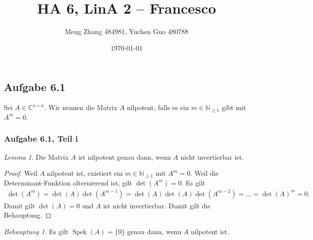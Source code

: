 \documentclass[draft,a5paper]{article}
\author{Meng Zhang 484981, Yuchen Guo 480788}
\date{\today}
\title{HA 6, LinA 2 -- Francesco}
\theoremstyle{remark}
\newtheorem*{beh}{Behauptung}
\newtheorem*{lem}{Lemma}
\DeclareMathOperator{\Spek}{Spek}
\begin{document}
\maketitle

\subsection*{Aufgabe 6.1}

Sei \(A \in \mathbb{C}^{n \times n}\). Wir nennen die Matrix \(A\) nilpotent, falls es
ein \(m \in \mathbb{N}_{\ge 1}\) gibt mit \(A^{m} = 0\).

\subsubsection*{Aufgabe 6.1, Teil i}

\begin{lem}
  Die Matrix \(A\) ist nilpotent genau dann, wenn \(A\) nicht
  invertierbar ist.
\end{lem}

\begin{proof}
  Weil \(A\) nilpotent ist, existiert ein \(m \in \mathbb{N}_{\ge 1}\) mit
  \(A^{m} = 0\).  Weil die Determinant-Funktion alternierend ist, gilt
  \(\det(A^{m}) = 0\).  Es gilt
  \begin{align*}
    \det(A^{m}) = \det(A)\det(A^{m-1}) = \det(A)\det(A)\det(A^{m-2}) =
    \ldots = \det(A)^{m} = 0.
  \end{align*}
  Damit gilt \(\det(A) = 0\) und \(A\) ist nicht invertierbar.  Damit
  gilt die Behauptung.
\end{proof}

\begin{beh}
  Es gilt \(\Spek(A) = \{0\}\) genau dann, wenn \(A\) nilpotent ist.
\end{beh}
\end{document}
